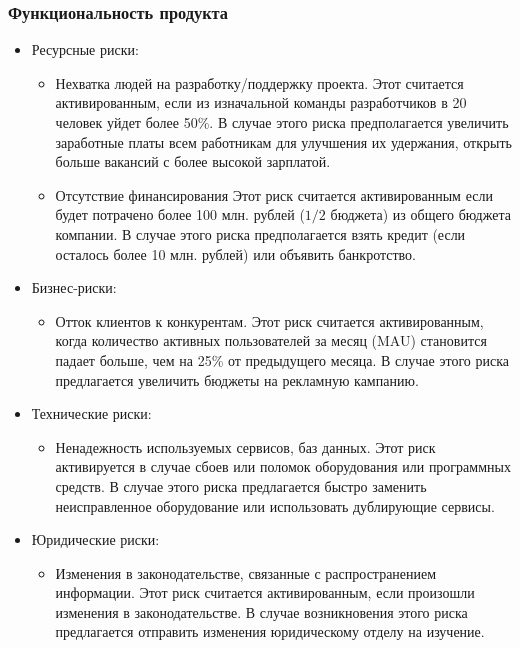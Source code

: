 \subsubsection{Функциональность продукта}
\begin{itemize}
\item Ресурсные риски:
    \begin{itemize}
        \item Нехватка людей на разработку/поддержку проекта.
          Этот считается активированным, если из изначальной команды разработчиков
          в 20 человек уйдет более 50\%.
          В случае этого риска предполагается увеличить заработные платы всем
          работникам для улучшения их удержания, открыть больше вакансий с более высокой зарплатой.
        \item Отсутствие финансирования
          Этот риск считается активированным если будет потрачено более 100 млн. рублей ($1/2$ бюджета)
          из общего бюджета компании.
          В случае этого риска предполагается взять кредит (если осталось более 10 млн. рублей)
          или объявить банкротство.
    \end{itemize}
\item Бизнес-риски:
    \begin{itemize}
        \item Отток клиентов к конкурентам.
          Этот риск считается активированным, когда количество активных пользователей за месяц (MAU)
          становится падает больше, чем на 25\% от предыдущего месяца.
          В случае этого риска предлагается увеличить бюджеты на рекламную кампанию.
    \end{itemize}
\item Технические риски:
        \begin{itemize}
        \item Ненадежность используемых сервисов, баз данных.
          Этот риск активируется в случае сбоев или поломок оборудования или программных средств.
          В случае этого риска предлагается быстро заменить неисправленное оборудование или
            использовать дублирующие сервисы.
    \end{itemize}
\item Юридические риски:
        \begin{itemize}
        \item Изменения в законодательстве, связанные с распространением информации.
          Этот риск считается активированным, если произошли изменения в законодательстве.
          В случае возникновения этого риска предлагается отправить изменения юридическому отделу на изучение.

\end{itemize}
\end{itemize}
